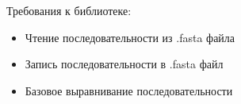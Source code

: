 \documentclass{article}
\begin{document}
Требования к библиотеке:
\begin{itemize}
  \item Чтение последовательности из .fasta файла
  \item Запись последовательности в  .fasta файл
  \item Базовое выравнивание последовательности
\end{itemize}
\end{document}
